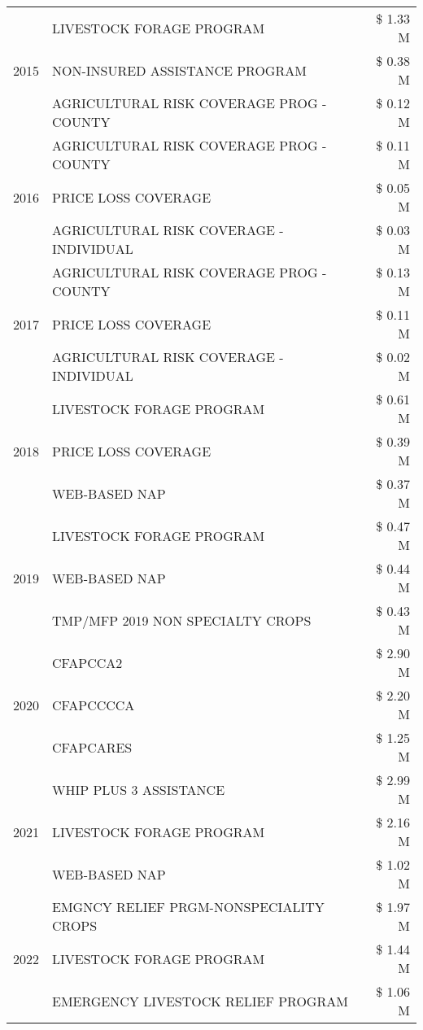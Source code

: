 \begin{tabular}{llr}
\cline{1-3}
\multirow[t]{3}{*}{2015} & LIVESTOCK FORAGE PROGRAM & \$ 1.33 M \\
 & NON-INSURED ASSISTANCE PROGRAM & \$ 0.38 M \\
 & AGRICULTURAL RISK COVERAGE PROG - COUNTY & \$ 0.12 M \\
\cline{1-3}
\multirow[t]{3}{*}{2016} & AGRICULTURAL RISK COVERAGE PROG - COUNTY & \$ 0.11 M \\
 & PRICE LOSS COVERAGE & \$ 0.05 M \\
 & AGRICULTURAL RISK COVERAGE - INDIVIDUAL & \$ 0.03 M \\
\cline{1-3}
\multirow[t]{3}{*}{2017} & AGRICULTURAL RISK COVERAGE PROG - COUNTY & \$ 0.13 M \\
 & PRICE LOSS COVERAGE & \$ 0.11 M \\
 & AGRICULTURAL RISK COVERAGE - INDIVIDUAL & \$ 0.02 M \\
\cline{1-3}
\multirow[t]{3}{*}{2018} & LIVESTOCK FORAGE PROGRAM & \$ 0.61 M \\
 & PRICE LOSS COVERAGE & \$ 0.39 M \\
 & WEB-BASED NAP & \$ 0.37 M \\
\cline{1-3}
\multirow[t]{3}{*}{2019} & LIVESTOCK FORAGE PROGRAM & \$ 0.47 M \\
 & WEB-BASED NAP & \$ 0.44 M \\
 & TMP/MFP 2019 NON SPECIALTY CROPS & \$ 0.43 M \\
\cline{1-3}
\multirow[t]{3}{*}{2020} & CFAPCCA2 & \$ 2.90 M \\
 & CFAPCCCCA & \$ 2.20 M \\
 & CFAPCARES & \$ 1.25 M \\
\cline{1-3}
\multirow[t]{3}{*}{2021} & WHIP PLUS 3 ASSISTANCE & \$ 2.99 M \\
 & LIVESTOCK FORAGE PROGRAM & \$ 2.16 M \\
 & WEB-BASED NAP & \$ 1.02 M \\
\cline{1-3}
\multirow[t]{3}{*}{2022} & EMGNCY RELIEF PRGM-NONSPECIALITY CROPS & \$ 1.97 M \\
 & LIVESTOCK FORAGE PROGRAM & \$ 1.44 M \\
 & EMERGENCY LIVESTOCK RELIEF PROGRAM & \$ 1.06 M \\
\cline{1-3}
\bottomrule
\end{tabular}
